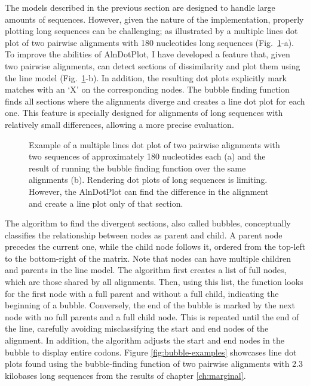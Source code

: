 The models described in the previous section are designed to handle large amounts of sequences. However, given the nature of the implementation, properly plotting long sequences can be challenging; as illustrated by a multiple lines dot plot of two pairwise alignments with 180 nucleotides long sequences (Fig.~\ref{fig:example-long}-a). To improve the abilities of AlnDotPlot, I have developed a feature that, given two pairwise alignments, can detect sections of dissimilarity and plot them using the line model (Fig.~\ref{fig:example-long}-b). In addition, the resulting dot plots explicitly mark matches with an `X' on the corresponding nodes. The bubble finding function finds all sections where the alignments diverge and creates a line dot plot for each one. This feature is specially designed for alignments of long sequences with relatively small differences, allowing a more precise evaluation.

\begin{figure}[!ht]
 \centering
    \begin{subfigure}[c]{\textwidth}
        \centering
        \scalebox{0.035}{}
        \caption{}
     \end{subfigure}
    \begin{subfigure}[c]{\textwidth}
        \centering
        \scalebox{0.6}{}
        \caption{}
     \end{subfigure}
 \caption[Multiple Lines and Bubble Dot Plots]{Example of a multiple lines dot plot of two pairwise alignments with two sequences of approximately 180 nucleotides each (a) and the result of running the bubble finding function over the same alignments (b). Rendering dot plots of long sequences is limiting. However, the AlnDotPlot can find the difference in the alignment and create a line plot only of that section.}
 \label{fig:example-long}
\end{figure}

The algorithm to find the divergent sections, also called bubbles, conceptually classifies the relationship between nodes as parent and child. A parent node precedes the current one, while the child node follows it, ordered from the top-left to the bottom-right of the matrix. Note that nodes can have multiple children and parents in the line model. The algorithm first creates a list of full nodes, which are those shared by all alignments. Then, using this list, the function looks for the first node with a full parent and without a full child, indicating the beginning of a bubble. Conversely, the end of the bubble is marked by the next node with no full parents and a full child node. This is repeated until the end of the line, carefully avoiding misclassifying the start and end nodes of the alignment. In addition, the algorithm adjusts the start and end nodes in the bubble to display entire codons. Figure \ref{fig:bubble-examples} showcases line dot plots found using the bubble-finding function of two pairwise alignments with 2.3 kilobases long sequences from the results of chapter \ref{ch:marginal}.

